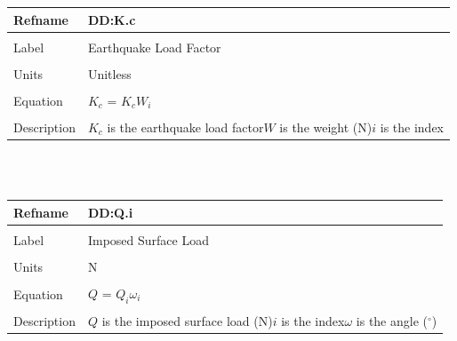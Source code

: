 \documentclass[12pt]{article}
\begin{document}
\noindent \begin{minipage}{\textwidth}
\begin{tabular}{p{} p{}}
\toprule \textbf{Refname} & \textbf{DD:K.c}
\label{DD:K.c}
\\ \midrule \\
Label & Earthquake Load Factor
\\ \midrule \\
Units & Unitless
\\ \midrule \\
Equation & ${K_{c}}$ = ${K_{c}} W_{i}$
\\ \midrule \\
Description & ${K_{c}}$ is the earthquake load factor\newline$W$ is the weight (N)\newline$i$ is the index
\\ \bottomrule \end{tabular}
\end{minipage}\\
~\newline
\noindent \begin{minipage}{\textwidth}
\begin{tabular}{p{} p{}}
\toprule \textbf{Refname} & \textbf{DD:Q.i}
\label{DD:Q.i}
\\ \midrule \\
Label & Imposed Surface Load
\\ \midrule \\
Units & N
\\ \midrule \\
Equation & $Q$ = $Q_{i} \omega{}_{i}$
\\ \midrule \\
Description & $Q$ is the imposed surface load (N)\newline$i$ is the index\newline$\omega{}$ is the angle (${}^{\circ}$)
\\ \bottomrule \end{tabular}
\end{minipage}\\
~\newline
\end{document}
